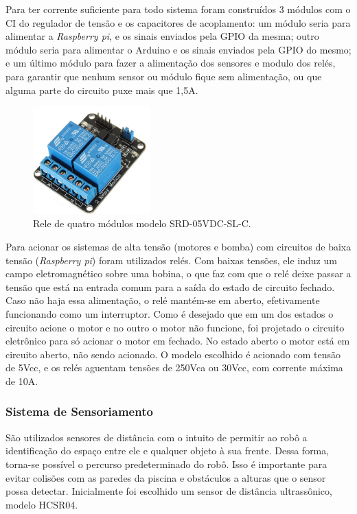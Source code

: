 Para ter corrente suficiente para todo sistema foram construídos 3 módulos com o CI do regulador de tensão e os capacitores de acoplamento: um módulo seria para alimentar a \textit{Raspberry pi}, e os sinais enviados pela GPIO da mesma; outro módulo seria para alimentar o Arduino e os sinais enviados pela GPIO do mesmo; e um último módulo para fazer a alimentação dos sensores e modulo dos relés, para garantir que nenhum sensor ou módulo fique sem alimentação, ou que alguma parte do circuito puxe mais que 1,5A.

\begin{figure}[h]
  \centering
  \includegraphics[width=0.4\textwidth]{figuras/rele.png}
  \caption{Rele de quatro módulos modelo SRD-05VDC-SL-C.}
  \label{fig:rele}
\end{figure}
\FloatBarrier

Para acionar os sistemas de alta tensão (motores e bomba) com circuitos de baixa tensão (\textit{Raspberry pi}) foram utilizados relés.  Com baixas tensões, ele induz um campo eletromagnético sobre uma bobina, o que faz com que o relé deixe passar a tensão que está na entrada comum para a saída do estado de circuito fechado. Caso não haja essa alimentação, o relé mantém-se em aberto, efetivamente funcionando como um interruptor.  Como é desejado que em um dos estados o circuito acione o motor e no outro o motor não funcione, foi projetado o circuito eletrônico para só acionar o motor em fechado. No estado aberto o motor está em circuito aberto, não sendo acionado. O modelo escolhido é acionado com tensão de 5Vcc, e os relés aguentam tensões de 250Vca ou 30Vcc, com corrente máxima de 10A.

\subsubsection{Sistema de Sensoriamento}
São utilizados sensores de distância com o intuito de permitir ao robô a identificação do espaço entre ele e qualquer objeto à sua frente. Dessa forma, torna-se possível o percurso predeterminado do robô. Isso é importante para evitar colisões com as paredes da piscina e obstáculos a alturas que o sensor possa detectar. Inicialmente foi escolhido um sensor de distância ultrassônico, modelo HCSR04.

